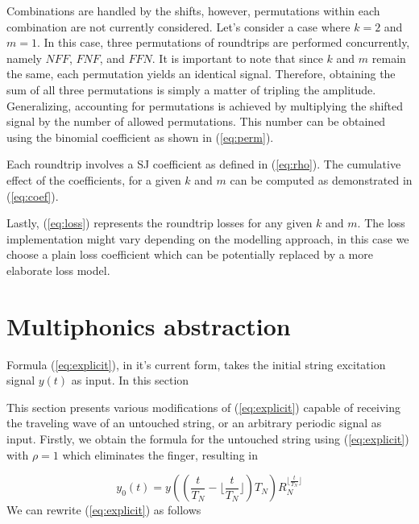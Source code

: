 \documentclass{sigchi}
\begin{document}
Combinations are handled by the shifts, however, permutations within each combination are not currently considered.
Let's consider a case where $k = 2$ and $m = 1$.
In this case, three permutations of roundtrips are performed concurrently, namely $NFF$, $FNF$, and $FFN$.
It is important to note that since $k$ and $m$ remain the same, each permutation yields an identical signal.
Therefore, obtaining the sum of all three permutations is simply a matter of tripling the amplitude.
Generalizing, accounting for permutations is achieved by multiplying the shifted signal by the number of allowed permutations.
This number can be obtained using the binomial coefficient as shown in (\ref{eq:perm}).

Each roundtrip involves a SJ coefficient as defined in (\ref{eq:rho}).
The cumulative effect of the coefficients, for a given $k$ and $m$ can be computed as demonstrated in (\ref{eq:coef}).

Lastly, (\ref{eq:loss}) represents the roundtrip losses for any given $k$ and $m$.
The loss implementation might vary depending on the modelling approach, in this case we choose a plain loss coefficient which can be potentially replaced by a more elaborate loss model.


\section{Multiphonics abstraction}

Formula (\ref{eq:explicit}), in it's current form, takes the initial string excitation signal $y(t)$ as input. In this section 

This section presents various modifications of (\ref{eq:explicit}) capable of receiving the traveling wave of an untouched string, or an arbitrary periodic signal as input.
Firstly, we obtain the formula for the untouched string using (\ref{eq:explicit}) with $\rho=1$ which eliminates the finger, resulting in

\begin{equation}
y_0(t) = y((\frac{t}{T_N}-\lfloor\frac{t}{T_N}\rfloor)T_N)R_N^{\lfloor\frac{t}{T_N}\rfloor}
\end{equation}
We can rewrite (\ref{eq:explicit}) as follows
\end{document}

